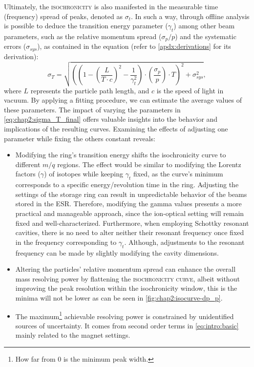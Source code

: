 Ultimately, the \textsc{isochronicity} is also manifested in the measurable time (frequency) spread of peaks, denoted as $\sigma_t$. In such a way, through offline analysis is possible to deduce the transition energy parameter ($\gamma_t$) among other beam parameters, such as the relative momentum spread ($\sigma_p/p$) and the systematic errors ($\sigma_{sys}$), as contained in the equation (refer to \cref{apdx:derivations} for its derivation):
\begin{equation}\label{eq:chap2:sigma_T_final}
    \sigma_T = \sqrt{\left(\left(1 - \left(\frac{L}{T \cdot c }\right)^2 - \frac{1}{\gamma_t^2}\right)\cdot\left(\frac{\sigma_p}{p}\right)\cdot T\right)^2 + \sigma_{sys}^2},
\end{equation}
where $L$ represents the particle path length, and $c$ is the speed of light in vacuum. By applying a fitting procedure, we can estimate the average values of these parameters.
\newpar
The impact of varying the parameters in \cref{eq:chap2:sigma_T_final} offers valuable insights into the behavior and implications of the resulting curves. Examining the effects of adjusting one parameter while fixing the others constant reveals:
\begin{itemize}
    \item Modifying the ring's transition energy shifts the isochronicity curve to different $m/q$ regions. The effect would be similar to modifying the Lorentz factors ($\gamma$) of isotopes while keeping $\gamma_t$ fixed, as the curve's minimum corresponds to a specific energy/revolution time in the ring. Adjusting the settings of the storage ring can result in unpredictable behavior of the beams stored in the \textsc{ESR}. Therefore, modifying the gamma values presents a more practical and manageable approach, since the ion-optical setting will remain fixed and well-characterized. Furthermore, when employing Schottky resonant cavities, there is no need to alter neither their resonant frequency once fixed in the frequency corresponding to $\gamma_t$. Although, adjustments to the resonant frequency can be made by slightly modifying the cavity dimensions.

    \item Altering the particles' relative momentum spread can enhance the overall mass resolving power by flattening the \textsc{isochronicity curve}, albeit without improving the peak resolution within the isochronicity window, this is the minima will not be lower as can be seen in \cref{fig:chap2:isocurve-dp_p}.

    \item The maximum\footnote{How far from $0$ is the minimum peak width.} achievable resolving power is constrained by unidentified sources of uncertainty. It comes from second order terms in \cref{eq:intro:basic} mainly related to the magnet settings.

\end{itemize}

